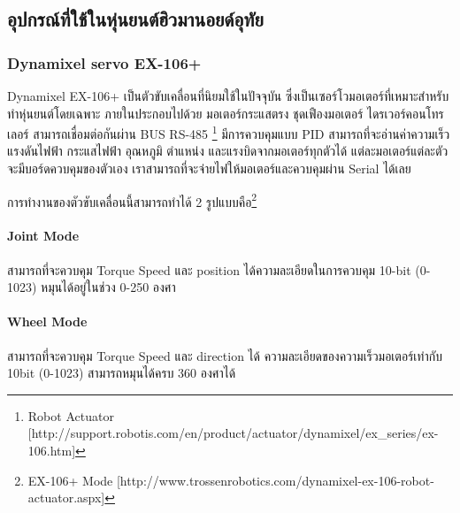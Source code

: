 \clearpage
\subsection{อุปกรณ์ที่ใช้ในหุ่นยนต์ฮิวมานอยด์อุทัย}

\subsubsection*{Dynamixel servo EX-106+}
Dynamixel EX-106+ เป็นตัวขับเคลื่อนที่นิยมใช้ในปัจจุบัน ซึ่งเป็นเซอร์โวมอเตอร์ที่เหมาะสำหรับทำหุ่นยนต์โดยเฉพาะ
ภายในประกอบไปด้วย มอเตอร์กระแสตรง ชุดเฟืองมอเตอร์ ไดรเวอร์คอนโทรเลอร์ สามารถเชื่อมต่อกันผ่าน BUS RS-485
\footnote{ Robot Actuator [http://support.robotis.com/en/product/actuator/dynamixel/ex\_series/ex-106.htm] }
มีการควบคุมแบบ PID สามารถที่จะอ่านค่าความเร็ว
แรงดันไฟฟ้า กระแสไฟฟ้า อุณหภูมิ ตำแหน่ง และแรงบิดจากมอเตอร์ทุกตัวได้ แต่ละมอเตอร์แต่ละตัวจะมีบอร์ดควบคุมของตัวเอง
เราสามารถที่จะจ่ายไฟให้มอเตอร์และควบคุมผ่าน Serial ได้เลย

การทำงานของตัวขับเคลื่อนนี้สามารถทำได้ 2 รูปแบบคือ\footnote{ EX-106+ Mode [http://www.trossenrobotics.com/dynamixel-ex-106-robot-actuator.aspx] }

\paragraph*{Joint Mode}
สามารถที่จะควบคุม Torque Speed และ position ได้ความละเอียดในการควบคุม 10-bit (0-1023) หมุนได้อยู่ในช่วง 0-250 องศา

\paragraph*{Wheel Mode}
สามารถที่จะควบคุม Torque Speed และ direction ได้ ความละเอียดของความเร็วมอเตอร์เท่ากับ 10bit (0-1023) สามารถหมุนได้ครบ 360 องศาได้

